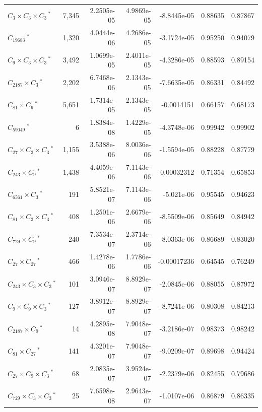 \documentclass[11pt]{article}
\begin{document}
\begin{longtable}{@{}lrrrrrr@{}}
\(C_{3}\!\times\!C_{3}\!\times\!C_{3}\,{}^{*}\) & 7,345 & 2.2505e-05 & 4.9869e-05 & -8.8445e-05 & 0.88635 & 0.87867 \\
\(C_{19683}\,{}^{*}\) & 1,320 & 4.0444e-06 & 4.2686e-05 & -3.1724e-05 & 0.95250 & 0.94079 \\
\(C_{9}\!\times\!C_{3}\!\times\!C_{3}\,{}^{*}\) & 3,492 & 1.0699e-05 & 2.4011e-05 & -4.3286e-05 & 0.88593 & 0.89154 \\
\(C_{2187}\!\times\!C_{3}\,{}^{*}\) & 2,202 & 6.7468e-06 & 2.1343e-05 & -7.6635e-05 & 0.86331 & 0.84492 \\
\(C_{81}\!\times\!C_{9}\,{}^{*}\) & 5,651 & 1.7314e-05 & 2.1343e-05 & -0.0014151 & 0.66157 & 0.68173 \\
\(C_{59049}\,{}^{*}\) & 6 & 1.8384e-08 & 1.4229e-05 & -4.3748e-06 & 0.99942 & 0.99902 \\
\(C_{27}\!\times\!C_{3}\!\times\!C_{3}\,{}^{*}\) & 1,155 & 3.5388e-06 & 8.0036e-06 & -1.5594e-05 & 0.88228 & 0.87779 \\
\(C_{243}\!\times\!C_{9}\,{}^{*}\) & 1,438 & 4.4059e-06 & 7.1143e-06 & -0.00032312 & 0.71354 & 0.65853 \\
\(C_{6561}\!\times\!C_{3}\,{}^{*}\) & 191 & 5.8521e-07 & 7.1143e-06 & -5.021e-06 & 0.95545 & 0.94623 \\
\(C_{81}\!\times\!C_{3}\!\times\!C_{3}\,{}^{*}\) & 408 & 1.2501e-06 & 2.6679e-06 & -8.5509e-06 & 0.85649 & 0.84942 \\
\(C_{729}\!\times\!C_{9}\,{}^{*}\) & 240 & 7.3534e-07 & 2.3714e-06 & -8.0363e-06 & 0.86689 & 0.83020 \\
\(C_{27}\!\times\!C_{27}\,{}^{*}\) & 466 & 1.4278e-06 & 1.7786e-06 & -0.00017236 & 0.64545 & 0.76249 \\
\(C_{243}\!\times\!C_{3}\!\times\!C_{3}\,{}^{*}\) & 101 & 3.0946e-07 & 8.8929e-07 & -2.0845e-06 & 0.88055 & 0.87972 \\
\(C_{9}\!\times\!C_{9}\!\times\!C_{3}\,{}^{*}\) & 127 & 3.8912e-07 & 8.8929e-07 & -8.7241e-06 & 0.80308 & 0.84213 \\
\(C_{2187}\!\times\!C_{9}\,{}^{*}\) & 14 & 4.2895e-08 & 7.9048e-07 & -3.2186e-07 & 0.98373 & 0.98242 \\
\(C_{81}\!\times\!C_{27}\,{}^{*}\) & 141 & 4.3201e-07 & 7.9048e-07 & -9.0209e-07 & 0.89698 & 0.94424 \\
\(C_{27}\!\times\!C_{9}\!\times\!C_{3}\,{}^{*}\) & 68 & 2.0835e-07 & 3.9524e-07 & -2.2379e-06 & 0.82455 & 0.79686 \\
\(C_{729}\!\times\!C_{3}\!\times\!C_{3}\,{}^{*}\) & 25 & 7.6598e-08 & 2.9643e-07 & -1.0107e-06 & 0.86879 & 0.86335 \\

\end{longtable}
\end{document}
